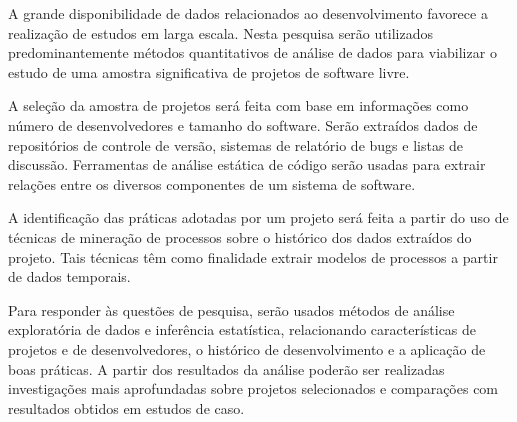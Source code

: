 \documentclass{article}
\begin{document}
A grande disponibilidade de dados relacionados ao desenvolvimento favorece a
realização de estudos em larga escala. Nesta pesquisa serão utilizados
predominantemente métodos quantitativos de análise de dados para viabilizar o
estudo de uma amostra significativa de projetos de software livre.

A seleção da amostra de projetos será feita com base em informações como número
de desenvolvedores e tamanho do software. Serão extraídos dados de repositórios
de controle de versão, sistemas de relatório de bugs e listas de discussão.
Ferramentas de análise estática de código serão usadas para extrair relações
entre os diversos componentes de um sistema de software.


A identificação das práticas adotadas por um projeto será feita a partir do uso
de técnicas de mineração de processos sobre o histórico dos dados extraídos do
projeto. Tais técnicas têm como finalidade extrair modelos de processos a partir
de dados temporais.

Para responder às questões de pesquisa, serão usados métodos de análise
exploratória de dados e inferência estatística, relacionando características de
projetos e de desenvolvedores, o histórico de desenvolvimento e a aplicação de
boas práticas. A partir dos resultados da análise poderão ser realizadas
investigações mais aprofundadas sobre projetos selecionados e comparações com
resultados obtidos em estudos de caso.
\end{document}
